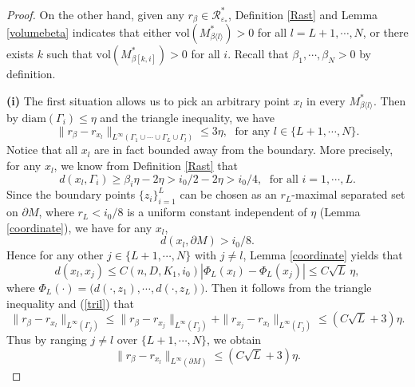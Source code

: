 \documentclass[11pt,letterpaper]{amsart}
\numberwithin{equation}{section}
\theoremstyle{definition}
\theoremstyle{plain}
\theoremstyle{definition}
\theoremstyle{plain}
\theoremstyle{definition}
\theoremstyle{plain}
\newcommand{\vol}{\textrm{vol}}
\begin{document}
\begin{proof}
\smallskip
On the other hand, given any $r_{\beta}\in \mathcal{R}^{\ast}_{\varepsilon_{\ast}}$, Definition \ref{Rast} and Lemma \ref{volumebeta} indicates that either $\vol(M_{\beta\langle l\rangle}^{\ast})>0$ for all $l=L+1,\cdots,N$, or there exists $k$ such that $\vol(M_{\beta[k,i]}^{\ast})>0$ for all $i$. Recall that $\beta_1,\cdots,\beta_N>0$ by definition.

\noindent \textbf{(i)} The first situation allows us to pick an arbitrary point $x_l$ in every $M_{\beta\langle l\rangle}^{\ast}$. Then by $\textrm{diam}(\Gamma_i)\leqslant\eta$ and the triangle inequality, we have
\begin{equation}\label{tril}
\|r_{\beta}-r_{x_l}\|_{L^{\infty}(\Gamma_1\cup\cdots\cup \Gamma_L\cup\Gamma_l)}\leqslant 3\eta, \;\textrm{ for any }l\in \{L+1,\cdots,N\}.
\end{equation}
Notice that all $x_l$ are in fact bounded away from the boundary. More precisely, for any $x_l$, we know from Definition \ref{Rast} that
$$d(x_l,\Gamma_i)\geqslant \beta_i\eta-2\eta > i_0/2-2\eta>i_0/4, \;\textrm{ for all }i=1,\cdots, L.$$
Since the boundary points $\{z_i\}_{i=1}^L$ can be chosen as an $r_L$-maximal separated set on $\partial M$, where $r_L<i_0/8$ is a uniform constant independent of $\eta$ (Lemma \ref{coordinate}), we have for any $x_l$,
$$d(x_l,\partial M)>i_0/8.$$
Hence for any other $j\in \{L+1,\cdots,N\}$ with $j\neq l$, Lemma \ref{coordinate} yields that 
$$d(x_l,x_j)\leqslant C(n,D,K_1,i_0)|\Phi_L(x_l)-\Phi_L(x_j)| \leqslant C\sqrt{L}\,\eta,$$
where $\Phi_L(\cdot)=\big(d(\cdot,z_1),\cdots,d(\cdot,z_L)\big)$. Then it follows from the triangle inequality and (\ref{tril}) that
$$\|r_{\beta}-r_{x_l}\|_{L^{\infty}(\Gamma_j)}\leqslant \|r_{\beta}-r_{x_j}\|_{L^{\infty}(\Gamma_j)}+\|r_{x_j}-r_{x_l}\|_{L^{\infty}(\Gamma_j)} \leqslant  (C\sqrt{L}+3)\eta.$$
Thus by ranging $j\neq l$ over $\{L+1,\cdots,N\}$, we obtain
\begin{equation*}\label{rbeta}
\|r_{\beta}-r_{x_l}\|_{L^{\infty}(\partial M)}\leqslant (C\sqrt{L}+3)\eta.
\end{equation*}


\end{proof}
\end{document}

